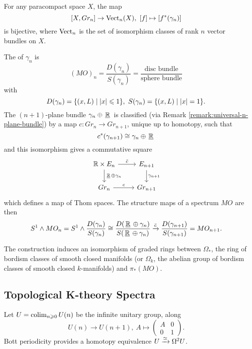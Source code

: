 \begin{remark!}\label{remark:universal-n-plane-bundle}
For any paracompact space $X$, the map
\[[X,Gr_n]\to\Vect_n(X),\ [f]\mapsto[f^*(\gamma_n)]\]
is bijective, where ${\normalfont\textup{Vect}}_n$ is the set of isomorphism classes of rank $n$ vector bundles on $X$.
\end{remark!}

The  of $\gamma_n$ is
\[(MO)_n=\frac{D(\gamma_n)}{S(\gamma_n)}=\frac{\text{disc bundle}}{\text{sphere bundle}}\]
with
\[D(\gamma_n)=\cb{(x,L)\mid |x|\leq1},\ S(\gamma_n)=\cb{(x,L)\mid |x|=1}.\]
The $(n+1)$-plane bundle $\gamma_n\oplus\,\underline{{\mathbb R}}\,$ is classified (via Remark \ref{remark:universal-n-plane-bundle}) by a map $c:Gr_n\to Gr_{n+1}$, unique up to homotopy, such that
\[c^*(\gamma_{n+1})\cong\gamma_n\oplus\,\underline{{\mathbb R}}\,\]
and this isomorphism gives a commutative square
\[
\begin{tikzcd}
\R\times E_n \ar[d,"\ul{\R}\oplus\gamma_n"] \ar[r,"\bar c"] & E_{n+1} \ar[d,"\gamma_{n+1}"] \\
Gr_n \ar[r,"c"] & Gr_{n+1}
\end{tikzcd}
\]
which defines a map of Thom spaces. The structure maps of a spectrum $MO$ are then
\[S^1\wedge MO_n=S^1\wedge\frac{D(\gamma_n)}{S(\gamma_n)}\cong\frac{D(\,\underline{{\mathbb R}}\,\oplus\gamma_n)}{S(\,\underline{{\mathbb R}}\,\oplus\gamma_n)}\xrightarrow{\bar c}\frac{D(\gamma_{n+1})}{S(\gamma_{n+1})}=MO_{n+1}.\]

\begin{theorem**}[Thom]
The  construction induces an isomorphism of graded rings between $\Omega_*$, the ring of bordism classes of smooth closed manifolds (or $\Omega_k$, the abelian group of bordism classes of smooth closed $k$-manifolds) and $\pi_*(MO)$.
\end{theorem**}

\subsection*{Topological K-theory Spectra}

Let $U=\operatorname*{colim}_{n\geqslant0}U(n)$ be the infinite unitary group, along
\[U(n)\to U(n+1),\ A\mapsto\begin{pmatrix} A & 0 \\ 0 & 1 \end{pmatrix}.\]
Bott periodicity provides a homotopy equivalence $U\xrightarrow{\simeq}\Omega^2U$.

